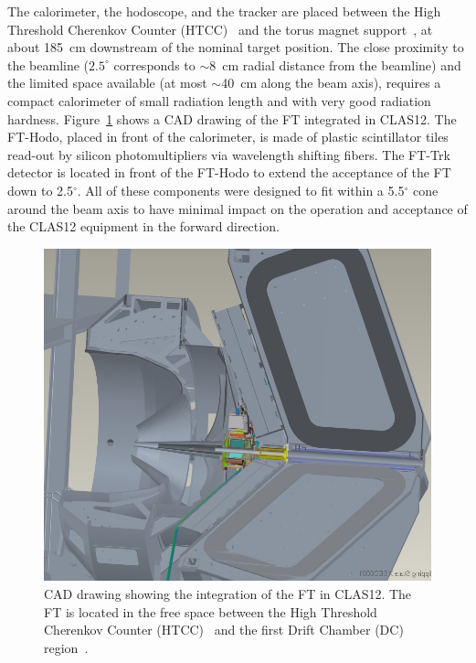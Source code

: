 The calorimeter, the hodoscope, and the tracker are placed between the High Threshold Cherenkov Counter
(HTCC)~\cite{htcc} and the torus magnet support~\cite{magnets}, at about 185~cm downstream of the nominal
target position. The close proximity to the beamline ($2.5^\circ$ corresponds to $\sim$8~cm radial distance
from the beamline) and the limited space available (at most $\sim$40~cm along the beam axis), requires a compact
calorimeter of small radiation length and with very good radiation hardness. Figure~\ref{fig:ftinclas12} shows a
CAD drawing of the FT integrated in CLAS12. The FT-Hodo, placed in front of the calorimeter, is made of plastic
scintillator tiles  read-out by silicon photomultipliers via wavelength shifting fibers. The FT-Trk detector is 
located in front of the FT-Hodo to extend the acceptance of the FT down to 2.5$^\circ$. All of these components
were designed to fit within a 5.5$^{\circ}$ cone around the beam axis to have minimal impact on the operation and
acceptance of the CLAS12 equipment in the forward direction.

\begin{figure}[th!]
\centering 
\includegraphics[width=\columnwidth]{./fig/ft_cad.jpg} 
\caption{CAD drawing showing the integration of the FT in CLAS12. The FT is located in the free space between
  the High Threshold Cherenkov Counter (HTCC)~\cite{htcc} and the first Drift Chamber (DC) region~\cite{dc}.} 
\label{fig:ftinclas12} 
\end{figure}
